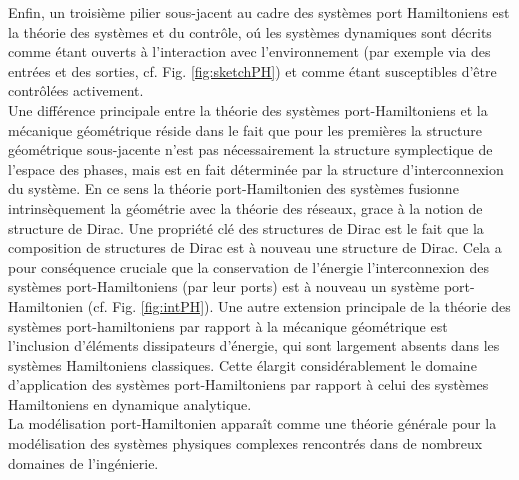 \documentclass[12pt, french]{article}
\begin{document}
Enfin, un troisième pilier sous-jacent au cadre des systèmes port Hamiltoniens est la théorie des systèmes et du contrôle, o\'u les systèmes dynamiques sont décrits comme étant ouverts à l'interaction avec l'environnement (par exemple via des entrées et des sorties, cf. Fig. \ref{fig:sketchPH}) et comme étant susceptibles d'être contrôlées activement. \\

Une différence principale entre la théorie des systèmes port-Hamiltoniens et la mécanique géométrique réside dans le fait que pour les premières la structure géométrique sous-jacente n'est pas nécessairement la structure symplectique de l'espace des phases, mais est en fait déterminée par la structure d'interconnexion du système.  En ce sens la théorie port-Hamiltonien des systèmes fusionne intrinsèquement la géométrie avec la théorie des réseaux, grace \`a la notion de structure de Dirac. Une propriété clé des structures de Dirac est le fait que la composition de structures de Dirac est à nouveau une structure de Dirac. Cela a pour conséquence cruciale que la conservation de l'énergie l'interconnexion des systèmes port-Hamiltoniens (par leur ports) est à nouveau un système port-Hamiltonien (cf. Fig. \ref{fig:intPH}). Une autre extension principale de la théorie des systèmes port-hamiltoniens par rapport à la mécanique géométrique est l'inclusion d'éléments dissipateurs d'énergie, qui sont largement absents dans les systèmes Hamiltoniens classiques. Cette élargit considérablement le domaine d'application des systèmes port-Hamiltoniens par rapport à celui des systèmes Hamiltoniens en dynamique analytique. \\

La modélisation port-Hamiltonien apparaît comme une théorie générale pour la modélisation des systèmes physiques complexes rencontrés dans de nombreux domaines de l'ingénierie.
\end{document}
